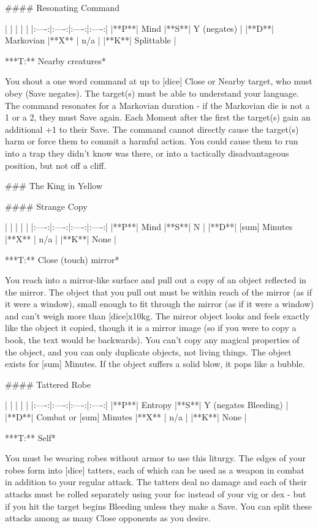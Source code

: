 #### Resonating Command

| | | | |
|:----:|:----:|:----:|:----:|
|**P**| Mind |**S**|  Y (negates) |
|**D**| Markovian |**X** |  n/a  |
|**K**| Splittable |


***T:**   Nearby creatures*



You shout a one word command at up to [dice] Close or Nearby target, who must obey (Save negates).  The target(s) must be able to understand your language.  The command resonates for a Markovian duration - if the Markovian die is not a 1 or a 2, they must Save again.  Each Moment after the first the target(s) gain an additional +1 to their Save.  The command cannot directly cause the target(s) harm or force them to commit a harmful action.  You could cause them to run into a trap they didn't know was there, or into a tactically disadvantageous position, but not off a cliff.


### The King in Yellow





#### Strange Copy

| | | | |
|:----:|:----:|:----:|:----:|
|**P**| Mind |**S**|  N |
|**D**| [sum] Minutes |**X** |  n/a  |
|**K**| None |


***T:**   Close (touch) mirror*



You reach into a mirror-like surface and pull out a copy of an object reflected in the mirror. The object that you pull out must be within reach of the mirror (as if it were a window), small enough to fit through the mirror (as if it were a window) and can't weigh more than [dice]x10kg. The mirror object looks and feels exactly like the object it copied, though it is a mirror image (so if you were to copy a book, the text would be backwards).  You can't copy any magical properties of the object, and you can only duplicate objects, not living things.  The object exists for [sum] Minutes.  If the object suffers a solid blow, it pops like a bubble.




#### Tattered Robe

| | | | |
|:----:|:----:|:----:|:----:|
|**P**| Entropy |**S**|  Y (negates Bleeding) |
|**D**| Combat or [sum] Minutes |**X** |  n/a  |
|**K**| None |


***T:**   Self*



You must be wearing robes without armor to use this liturgy.  The edges of your robes form into [dice] tatters, each of which can be used as a weapon in combat in addition to your regular attack. The tatters deal no damage and each of their attacks must be rolled separately using your {foc} instead of your {vig} or {dex} - but if you hit the target begins Bleeding unless they make a Save.  You can split these attacks among as many Close opponents as you desire.

